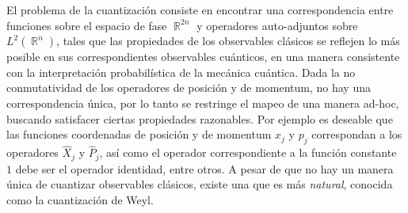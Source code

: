 \documentclass[a4paper]{report}
\DeclareMathOperator{\R}{\mathbb{R}}
\begin{document}
  El problema de la cuantización consiste en encontrar una
  correspondencia entre funciones sobre el espacio de fase
  $\R^{2n}$ y operadores auto-adjuntos sobre $L^2(\R^{n})$,
  tales que las propiedades de los observables clásicos se
  reflejen lo más posible en sus correspondientes
  observables cuánticos, en una manera consistente con la
  interpretación probabilística de la mecánica cuántica.
  Dada la no conmutatividad de los operadores de posición y
  de momentum, no hay una correspondencia única, por lo
  tanto se restringe el mapeo de una manera ad-hoc, buscando
  satisfacer ciertas propiedades razonables. Por ejemplo es
  deseable que las funciones coordenadas de posición y de
  momentum $x_j$ y $p_j$ correspondan a los operadores
  $\hat{X}_j$ y $\hat{P}_j$, así como el operador
  correspondiente a la función constante $1$ debe ser el
  operador identidad, entre otros.  A pesar de que no hay un
  manera única de cuantizar observables clásicos, existe una
  que es más \textit{natural}, conocida como la cuantización
  de Weyl. 
\end{document}
